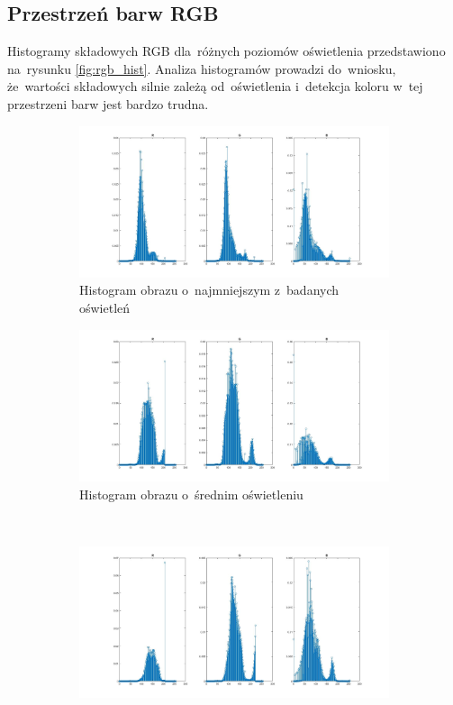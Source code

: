 \subsection{Przestrzeń barw RGB}
\label{sec:RGB}
Histogramy składowych RGB dla~różnych poziomów oświetlenia przedstawiono na~rysunku \ref{fig:rgb_hist}.
Analiza histogramów prowadzi do~wniosku, że~wartości składowych silnie zależą od~oświetlenia i~detekcja koloru w~tej przestrzeni barw jest bardzo trudna.
\begin{figure}
	\centering
	\begin{subfigure}{0.9\textwidth}
		\centering
		\includegraphics[width=\textwidth]{hist_rgb1.jpg}
		\caption{Histogram obrazu o~najmniejszym z~badanych oświetleń}
		\label{fig:rgb_hist1}
	\end{subfigure}
	\begin{subfigure}{0.9\textwidth}
		\centering
		\includegraphics[width=\textwidth]{hist_rgb2.jpg}
		\caption{Histogram obrazu o~średnim oświetleniu}
		\label{fig:rgb_hist2}
	\end{subfigure}\\
	\begin{subfigure}{0.9\textwidth}
		\centering
		\includegraphics[width=\textwidth]{hist_rgb3.jpg}

\end{subfigure}
\end{figure}

